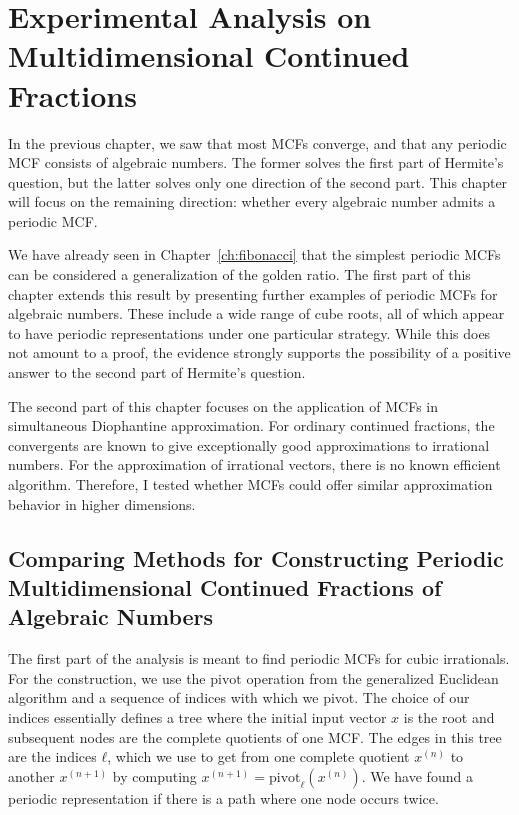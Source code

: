 \chapter{Experimental Analysis on Multidimensional Continued Fractions}
\label{ch:implementation}

In the previous chapter, we saw that most MCFs converge,
and that any periodic MCF consists of algebraic numbers.
The former solves the first part of Hermite's question, but the latter solves
only one direction of the second part.
This chapter will focus on the remaining direction:
whether every algebraic number admits a periodic MCF.

We have already seen in Chapter~\ref{ch:fibonacci}
that the simplest periodic MCFs can be considered a generalization of the
golden ratio.
The first part of this chapter extends this result by presenting further
examples of periodic MCFs for algebraic numbers.
These include a wide range of cube roots,
all of which appear to have periodic representations under one particular strategy.
While this does not amount to a proof, the evidence strongly supports
the possibility of a positive answer to the second part of Hermite’s question.

The second part of this chapter focuses on the application of MCFs in simultaneous Diophantine approximation.
For ordinary continued fractions, the convergents are known to give
exceptionally good approximations to irrational numbers.
For the approximation of irrational vectors, there is no known efficient algorithm.
Therefore, I tested whether MCFs could offer similar approximation behavior in higher dimensions.

\section{Comparing Methods for Constructing Periodic Multidimensional Continued Fractions of Algebraic Numbers}
\label{sec:comparison}

The first part of the analysis is meant to find periodic MCFs for cubic
irrationals.
For the construction, we use the $\mathrm{pivot}$ operation from the
generalized Euclidean algorithm and a sequence of indices with which we pivot.
The choice of our indices essentially defines a tree
where the initial input vector $x$ is the root
and subsequent nodes are the complete quotients of one MCF.
The edges in this tree are the indices $ℓ$, which we use to get from one
complete quotient $x^{(n)}$ to another $x^{(n+1)}$ by computing $x^{(n+1)} =
\mathrm{pivot}_ℓ(x^{(n)})$.
We have found a periodic representation if there is a path where one node
occurs twice.

